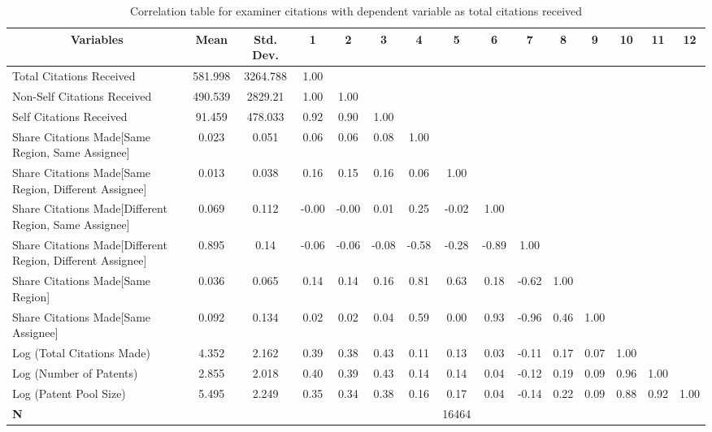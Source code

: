 \begin{table}[htbp]\centering \caption{Correlation table for examiner citations with dependent variable as total citations received \label{e.tcorrelation}}
\scriptsize
\onehalfspacing
\begin{adjustbox}{angle=90}
\begin{tabular}{l  c  c  c  c  c  c  c  c  c  c  c  c  c  c }\hline\hline
\multicolumn{1}{c}{Variables} & \textbf{Mean}& \textbf{Std. Dev.}&1&2&3&4&5&6&7&8&9&10&11&12\\ \hline 
Total Citations Received& 581.998 & 3264.788&1.00\\
Non-Self Citations Received& 490.539 & 2829.21&1.00&1.00\\
Self Citations Received& 91.459 & 478.033&0.92&0.90&1.00\\
Share Citations Made[Same Region, Same Assignee]& 0.023 & 0.051&0.06&0.06&0.08&1.00\\
Share Citations Made[Same Region, Different Assignee]& 0.013 & 0.038&0.16&0.15&0.16&0.06&1.00\\
Share Citations Made[Different Region, Same Assignee] & 0.069 & 0.112&-0.00&-0.00&0.01&0.25&-0.02&1.00\\
Share Citations Made[Different Region, Different Assignee]& 0.895 & 0.14&-0.06&-0.06&-0.08&-0.58&-0.28&-0.89&1.00\\
Share Citations Made[Same Region]& 0.036 & 0.065&0.14&0.14&0.16&0.81&0.63&0.18&-0.62&1.00\\
Share Citations Made[Same Assignee]& 0.092 & 0.134&0.02&0.02&0.04&0.59&0.00&0.93&-0.96&0.46&1.00\\
Log (Total Citations Made)& 4.352 & 2.162&0.39&0.38&0.43&0.11&0.13&0.03&-0.11&0.17&0.07&1.00\\
Log (Number of Patents)& 2.855 & 2.018&0.40&0.39&0.43&0.14&0.14&0.04&-0.12&0.19&0.09&0.96&1.00\\
Log (Patent Pool Size)& 5.495 & 2.249&0.35&0.34&0.38&0.16&0.17&0.04&-0.14&0.22&0.09&0.88&0.92&1.00\\
\hline
\textbf{N}&&&&&&&16464\\
\hline \hline 
 \end{tabular}
 \end{adjustbox}
\end{table}
